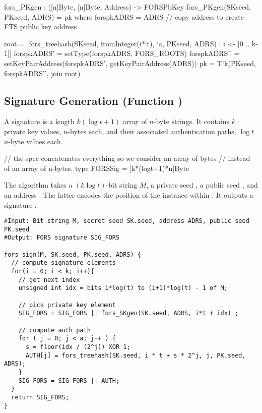 \begin{code}
  fors_PKgen : ([n]Byte, [n]Byte, Address) -> FORSPbKey
  fors_PKgen(SKseed, PKseed, ADRS) = pk where
    forspkADRS = ADRS // copy address to create FTS public key address

    root = [fors_treehash(SKseed, fromInteger(i*`t), `a, PKseed, ADRS)
            | i <- [0 .. k-1]]
    forspkADRS' = setType(forspkADRS, FORS_ROOTS)
    forspkADRS'' = setKeyPairAddress(forspkADRS', getKeyPairAddress(ADRS))
    pk = T`{k}(PKseed, forspkADRS'', join root)
\end{code}

\subsection{\fors Signature Generation (Function \forssign)}
A \fors signature is a length $k(\log t + 1)$ array of $n$-byte strings. It contains
$k$ private key values, $n$-bytes each, and their associated authentication
paths, $\log t$ $n$-byte values each.

\begin{code}
  // the spec concatenates everything so we consider an array of bytes
  // instead of an array of n-bytes.
  type FORSSig = [k*(logt+1)*n]Byte
\end{code}

The algorithm \forssign takes a $(k\log t)$-bit string $M$, a private seed \sseed,
a public seed \pseed, and an address \adrs. The latter encodes the position of
the \fors instance within \spx. It outputs a \fors signature \forssig.

\begin{lstlisting}[label=alg:fors_sign, language=pseudoc,
                   caption=\forssign\ -- Generating a FORS signature on string $M$.]
#Input: Bit string M, secret seed SK.seed, address ADRS, public seed PK.seed
#Output: FORS signature SIG_FORS

fors_sign(M, SK.seed, PK.seed, ADRS) {
  // compute signature elements
  for(i = 0; i < k; i++){
    // get next index
    unsigned int idx = bits i*log(t) to (i+1)*log(t) - 1 of M;

    // pick private key element
    SIG_FORS = SIG_FORS || fors_SKgen(SK.seed, ADRS, i*t + idx) ;

    // compute auth path
    for ( j = 0; j < a; j++ ) {
      s = floor(idx / (2^j)) XOR 1;
      AUTH[j] = fors_treehash(SK.seed, i * t + s * 2^j, j, PK.seed, ADRS);
    }
    SIG_FORS = SIG_FORS || AUTH;
  }
  return SIG_FORS;
}
\end{lstlisting}

